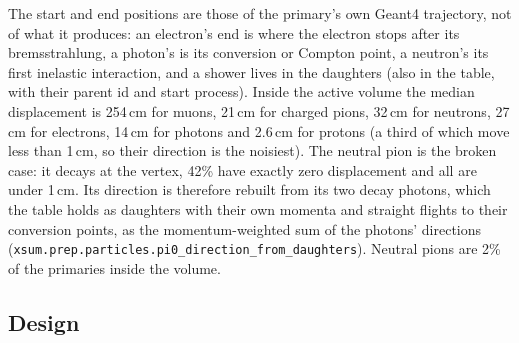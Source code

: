 \documentclass[10pt,letterpaper]{article}
\newcommand{\code}[1]{\texttt{#1}}
\newcommand{\pct}[1]{#1\%}
\begin{document}
The start and end positions are those of the primary's own Geant4 trajectory, not of what it produces: an electron's
end is where the electron stops after its bremsstrahlung, a photon's is its conversion or Compton point, a neutron's
its first inelastic interaction, and a shower lives in the daughters (also in the table, with their parent id and
start process). Inside the active volume the median displacement is 254\,cm for muons, 21\,cm for charged pions,
32\,cm for neutrons, 27\,cm for electrons, 14\,cm for photons and 2.6\,cm for protons (a third of which move less
than 1\,cm, so their direction is the noisiest). The neutral pion is the broken case: it decays at the vertex, \pct{42}
have exactly zero displacement and all are under 1\,cm. Its direction is therefore rebuilt from its two decay photons,
which the table holds as daughters with their own momenta and straight flights to their conversion points, as the
momentum-weighted sum of the photons' directions (\code{xsum.prep.particles.pi0\_direction\_from\_daughters}).
Neutral pions are \pct{2} of the primaries inside the volume.

\subsection{Design}\label{sec:design}
\end{document}

